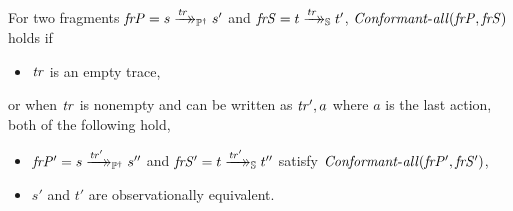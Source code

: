 \begin{definition}
    For two fragments $\mathit{frP} = s \xrightarrow{\mathit{tr}}\mathrel{\mkern-14mu}\rightarrow_{\mathbb P^\dagger} s'$ and $\mathit{frS} = t \xrightarrow{\mathit{tr}}\mathrel{\mkern-14mu}\rightarrow_{\mathbb S} t'$, $\mathit{Conformant{\text-}all(\mathit{frP}, \mathit{frS})}$ holds if
    \begin{itemize}
        \item $\mathit{tr}$ is an empty trace,
    \end{itemize}
    or when $\mathit{tr}$ is nonempty and can be written as $\mathit{tr'}, a$ where $a$ is the last action, both of the following hold,
    \begin{itemize}
        \item $\mathit{frP'} = s \xrightarrow{\mathit{tr'}}\mathrel{\mkern-14mu}\rightarrow_{\mathbb P^\dagger} s''$ and $\mathit{frS'} = t \xrightarrow{\mathit{tr'}}\mathrel{\mkern-14mu}\rightarrow_{\mathbb S} t''$ satisfy $\mathit{Conformant{\text-}all}(\mathit{frP'}, \mathit{frS'})$,
        \item $s'$ and $t'$ are observationally equivalent.
    \end{itemize}
\end{definition}


